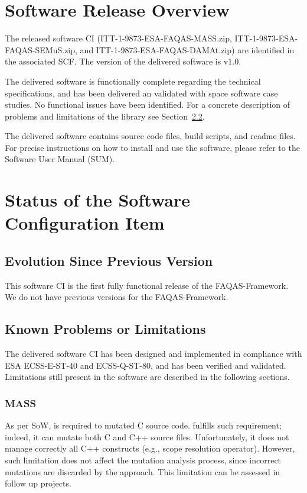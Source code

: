 
\chapter{Software Release Overview}

The released software CI (ITT-1-9873-ESA-FAQAS-MASS.zip, ITT-1-9873-ESA-FAQAS-SEMuS.zip, and ITT-1-9873-ESA-FAQAS-DAMAt.zip) are identified in the associated SCF. The version of the delivered software is v1.0.

The delivered software is functionally complete regarding the technical specifications, and has been delivered an validated with space software case studies. No functional issues have been identified. For a concrete description of problems and limitations of the library see Section~\ref{sec:limitations}.

The delivered software contains source code files, build scripts, and readme files. For precise instructions on how to install and use the software, please refer to the Software User Manual (SUM).


\chapter{Status of the Software Configuration Item}

\section{Evolution Since Previous Version}

This software CI is the first fully functional release of the FAQAS-Framework. We do not have previous versions for the FAQAS-Framework.

\section{Known Problems or Limitations}
\label{sec:limitations}

The delivered software CI has been designed and implemented in compliance with ESA ECSS-E-ST-40 and ECSS-Q-ST-80, and has been verified and validated. Limitations still present in the software are described in the following sections.

\subsection{MASS}

As per SoW, \MASS is required to mutated C source code. \MASS fulfills such requirement; indeed, it can mutate both C and C++ source files. Unfortunately, it does not manage correctly all C++ constructs (e.g., scope resolution operator). However, such limitation does not affect the mutation analysis process, since incorrect mutations are discarded by the approach. 
This limitation can be assessed in follow up projects.

